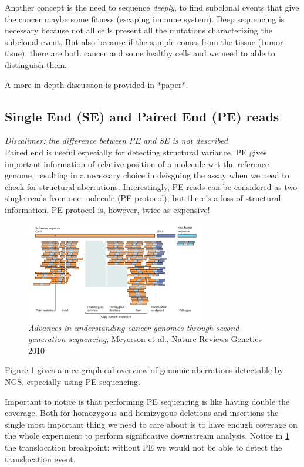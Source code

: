 Another concept is the need to sequence \textit{deeply}, to find subclonal events that give the cancer maybe some fitness (escaping immune system). Deep sequencing is necessary because not all cells present all the mutations characterizing the subclonal event. But also because if the sample comes from the tissue (tumor tisue), there are both cancer and some healthy cells and we need to able to distinguish them.

A more in depth discussion is provided in *paper*.

\subsection{Single End (SE) and Paired End (PE) reads} \label{SE_PE}
\textit{Discalimer: the difference between PE and SE is not described}\\
Paired end is useful especially for detecting structural variance. PE gives important information of relative position of a molecule wrt the reference genome, resulting in a necessary choice in deisgning the assay when we need to check for structural aberrations. 
Interestingly, PE reads can be considered as two single reads from one molecule (PE protocol); but there's a loss of
structural information.
PE protocol is, however, twice as expensive!

\begin{figure}[htbp!]
    \centering
    \includegraphics[width=0.7\textwidth]{igv.png}
    \caption{\textit{Advances in understanding cancer genomes through second-generation sequencing}, Meyerson et al., Nature Reviews Genetics 2010}
    \label{fig:igv}
\end{figure}

Figure \ref{fig:igv} gives a nice graphical overview of genomic aberrations detectable by NGS, especially using PE sequencing. 

Important to notice is that performing PE sequencing is like having double the coverage. 
Both for homozygous and hemizygous deletions and insertions the single most important thing we need to care about is to have enough coverage on the whole experiment to perform significative downstream analysis. 
Notice in \ref{fig:igv} the translocation breakpoint: without PE we would not be able to detect the translocation event. 

 















